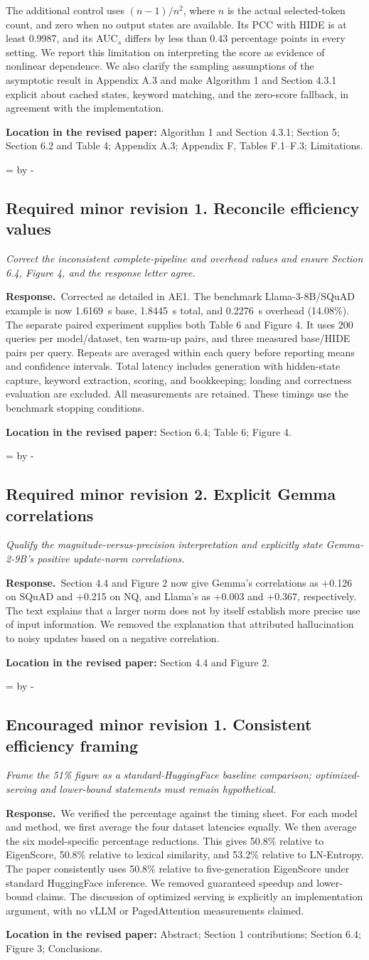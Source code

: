 \documentclass[11pt]{article}
\newcommand{\Needspace}[1]{\par\begingroup
  \dimen0=\pagegoal\advance\dimen0 by -\pagetotal
  \ifdim\dimen0<#1\relax\newpage\fi\endgroup}
\newcommand{\reviewcomment}[2]{%
  \Needspace{9\baselineskip}%
  \subsection*{#1}%
  \begin{tcolorbox}[enhanced,breakable,colback=gray!8,colframe=gray!50,
    boxrule=0pt,borderline west={2pt}{0pt}{gray!55},sharp corners]
  \itshape #2
  \end{tcolorbox}}
\newcommand{\response}{\textbf{Response.}\ }
\newcommand{\location}[1]{\par\textbf{Location in the revised paper:} #1\par}
\begin{document}
The additional control uses $(n-1)/n^2$, where $n$ is the actual selected-token count, and zero when no output states are available. Its PCC with HIDE is at least 0.9987, and its AUC$_s$ differs by less than 0.43 percentage points in every setting. We report this limitation on interpreting the score as evidence of nonlinear dependence. We also clarify the sampling assumptions of the asymptotic result in Appendix A.3 and make Algorithm 1 and Section 4.3.1 explicit about cached states, keyword matching, and the zero-score fallback, in agreement with the implementation.
\location{Algorithm 1 and Section 4.3.1; Section 5; Section 6.2 and Table 4; Appendix A.3; Appendix F, Tables F.1--F.3; Limitations.}

\reviewcomment{Required minor revision 1. Reconcile efficiency values}{Correct the inconsistent complete-pipeline and overhead values and ensure Section 6.4, Figure 4, and the response letter agree.}
\response Corrected as detailed in AE1. The benchmark Llama-3-8B/SQuAD example is now 1.6169~s base, 1.8445~s total, and 0.2276~s overhead (14.08\%). The separate paired experiment supplies both Table 6 and Figure 4. It uses 200 queries per model/dataset, ten warm-up pairs, and three measured base/HIDE pairs per query. Repeats are averaged within each query before reporting means and confidence intervals. Total latency includes generation with hidden-state capture, keyword extraction, scoring, and bookkeeping; loading and correctness evaluation are excluded. All measurements are retained. These timings use the benchmark stopping conditions.
\location{Section 6.4; Table 6; Figure 4.}

\reviewcomment{Required minor revision 2. Explicit Gemma correlations}{Qualify the magnitude-versus-precision interpretation and explicitly state Gemma-2-9B's positive update-norm correlations.}
\response Section 4.4 and Figure 2 now give Gemma's correlations as +0.126 on SQuAD and +0.215 on NQ, and Llama's as +0.003 and +0.367, respectively. The text explains that a larger norm does not by itself establish more precise use of input information. We removed the explanation that attributed hallucination to noisy updates based on a negative correlation.
\location{Section 4.4 and Figure 2.}

\reviewcomment{Encouraged minor revision 1. Consistent efficiency framing}{Frame the 51\% figure as a standard-HuggingFace baseline comparison; optimized-serving and lower-bound statements must remain hypothetical.}
\response We verified the percentage against the timing sheet. For each model and method, we first average the four dataset latencies equally. We then average the six model-specific percentage reductions. This gives 50.8\% relative to EigenScore, 50.8\% relative to lexical similarity, and 53.2\% relative to LN-Entropy. The paper consistently uses 50.8\% relative to five-generation EigenScore under standard HuggingFace inference. We removed guaranteed speedup and lower-bound claims. The discussion of optimized serving is explicitly an implementation argument, with no vLLM or PagedAttention measurements claimed.
\location{Abstract; Section 1 contributions; Section 6.4; Figure 3; Conclusions.}
\end{document}
